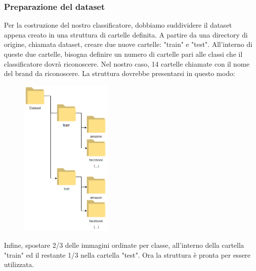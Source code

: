 \documentclass[twoside]{supsistudent}
\begin{document}
\subsubsection{Preparazione del dataset}
Per la costruzione del nostro classificatore, dobbiamo suddividere il dataset appena creato in una struttura di cartelle definita.
A partire da una directory di origine, chiamata dataset, creare due nuove cartelle: "train" e "test". All'interno di queste due cartelle, bisogna definire un numero di cartelle pari alle classi che il classificatore dovrà riconoscere. Nel nostro caso, 14 cartelle chiamate con il nome del brand da riconoscere.
La struttura dovrebbe presentarsi in questo modo:
\begin{figure}[h!]
  \centering
    \includegraphics[width=0.4\textwidth]{Pictures/keras_tree.PNG}
\end{figure}
\newline
Infine, spostare 2/3 delle immagini ordinate per classe, all'interno della cartella "train" ed il restante 1/3 nella cartella "test". Ora la struttura è pronta per essere utilizzata.
\end{document}
